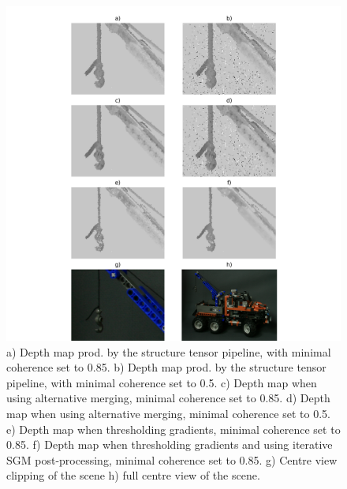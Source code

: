 \documentclass  [
  paper    = a4,
  BCOR     = 10mm,
  twoside,
  fontsize = 12pt,
  fleqn,
  toc      = bibnumbered,
  toc      = listofnumbered,
  numbers  = noendperiod,
  headings = normal,
  listof   = leveldown,
  version  = 3.03
]                                       {scrreprt}
\begin{document}
\begin{figure}[h!]
	\centering
	\includegraphics[width=1\linewidth]{images/truck_realdata_small.png}
	\caption[Truck clipping with iterative SGM]{a) Depth map prod. by the structure tensor pipeline, with minimal coherence set to 0.85. b) Depth map prod. by the structure tensor pipeline, with minimal coherence set to 0.5. c) Depth map when using alternative merging, minimal coherence set to 0.85. d) Depth map when using alternative merging, minimal coherence set to 0.5. e) Depth map when thresholding gradients, minimal coherence set to 0.85. f) Depth map when thresholding gradients and using iterative SGM post-processing, minimal coherence set to 0.85.  g) Centre view clipping of the scene h) full centre view of the scene.}
	\label{fig:truckrealdatasmall}
\end{figure}
\newpage
\end{document}
